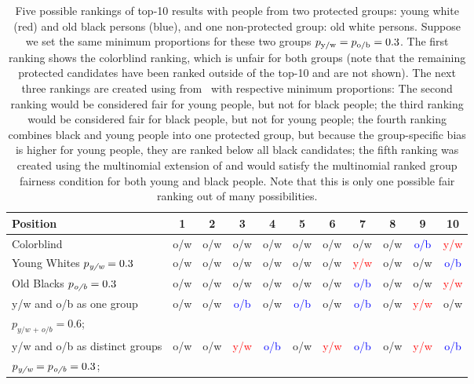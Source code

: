 \begin{table}[t]
	\caption[Introductory example for the extension of \algoFAIR to multiple protected groups]{Five possible rankings of top-10 results with people from two protected groups: young white (red) and old black persons (blue), and one non-protected group: old white persons. 
	Suppose we set the same minimum proportions for these two groups $p_{\text{y/w}} = p_{\text{o/b}} = 0.3$.
	The first ranking shows the colorblind ranking, which is unfair for both groups (note that the remaining protected candidates have been ranked outside of the top-10 and are not shown).
	The next three rankings are created using \algoFAIR from~\cite{zehlike2017fair} with respective minimum proportions:
	The second ranking would be considered fair for young people, but not for black people; the third ranking would be considered fair for black people, but not for young people; the fourth ranking combines black and young people into one protected group, but because the group-specific bias is higher for young people, they are ranked below all black candidates; the fifth ranking was created using the multinomial extension of \algoFAIR and would satisfy the multinomial ranked group fairness condition for both young and black people.
	Note that this is only one possible fair ranking out of many possibilities.
		\label{tbl:multinomial_intro_example}}
	\centering\begin{tabular}{lcccccccccc}\toprule
		Position & 1 &2 & 3 &4& 5& 6& 7& 8& 9& 10  \\
		\midrule
		\rowcolor[HTML]{C0C0C0}
		Colorblind & o/w & o/w & o/w & o/w & o/w & o/w & o/w & o/w & \textcolor{blue}{o/b} & \textcolor{red}{y/w} \\
		Young Whites $p_\textit{y/w}=0.3$ & o/w &o/w& o/w& o/w& o/w& o/w& \textcolor{red}{y/w}& o/w & o/w & \textcolor{blue}{o/b} \\
		\rowcolor[HTML]{C0C0C0}
		Old Blacks $p_\textit{o/b}=0.3$ & o/w &o/w &o/w& o/w &o/w &o/w& \textcolor{blue}{o/b}& o/w& o/w& \textcolor{red}{y/w} \\
		y/w and o/b as one group & o/w &o/w& \textcolor{blue}{o/b} & o/w& \textcolor{blue}{o/b}& o/w & \textcolor{blue}{o/b}& o/w& \textcolor{red}{y/w}& o/w \\
		$p_{\textit{y/w + o/b}}=0.6$; &&&&&&&&&&\\
		\rowcolor[HTML]{C0C0C0}
		y/w and o/b as distinct groups& o/w& o/w &\textcolor{red}{y/w}& \textcolor{blue}{o/b}& o/w& \textcolor{red}{y/w} &\textcolor{blue}{o/b}& o/w& \textcolor{red}{y/w}& \textcolor{blue}{o/b} \\
		\rowcolor[HTML]{C0C0C0}
		 $p_{\textit{y/w}} = p_{\textit{o/b}} = 0.3$; &&&&&&&&&&\\
		\bottomrule
	\end{tabular}
\end{table}

